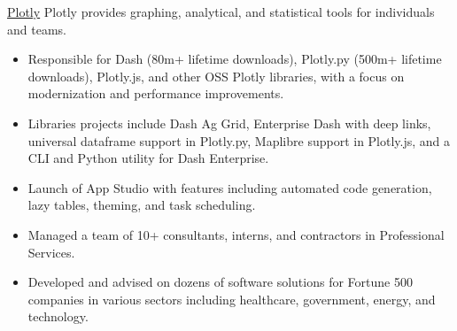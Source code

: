 \documentclass[10pt,ragged2e]{altacv}
\begin{document}
\tagline{}

\begin{fullwidth}
      \makecvheader
\end{fullwidth}


\href{https://plotly.com}{Plotly} Plotly provides graphing, analytical, and statistical tools for individuals and teams.
\\[8pt]

\begin{itemize}
      \item Responsible for Dash (80m+ lifetime downloads), Plotly.py (500m+ lifetime
            downloads), Plotly.js, and other OSS Plotly libraries, with a focus on
            modernization and performance improvements.
      \item Libraries projects include Dash Ag Grid, Enterprise Dash with deep links,
            universal dataframe support in Plotly.py, Maplibre support in Plotly.js, and a
            CLI and Python utility for Dash Enterprise.
      \item Launch of App Studio with features including automated code generation, lazy
            tables, theming, and task scheduling.
\end{itemize}

\divider

\begin{itemize}
      \item Managed a team of 10+ consultants, interns, and contractors in Professional
            Services.
      \item Developed and advised on dozens of software solutions for Fortune 500 companies
            in various sectors including healthcare, government, energy, and technology.
\end{itemize}
\end{document}
